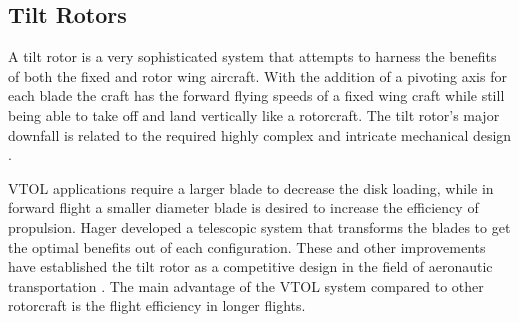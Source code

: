 \documentclass[a4paper, 10pt, conference]{ieeeconf}
\begin{document}
\subsection{Tilt Rotors}

A tilt rotor is a very sophisticated system that attempts to harness the benefits of both the fixed and rotor wing aircraft. With the addition of a pivoting axis for each blade the craft has the forward flying speeds of a fixed wing craft while still being able to take off and land vertically like a rotorcraft. The tilt rotor's major downfall is related to the required highly complex and intricate mechanical design \cite{RotorConfig}.
 
VTOL applications require a larger blade to decrease the disk loading, while in forward flight a smaller diameter blade is desired to increase the efficiency of propulsion. Hager \cite{US6030177} developed a telescopic system that transforms the blades to get the optimal benefits out of each configuration. These and other improvements have established the tilt rotor as a competitive design in the field of aeronautic transportation \cite{RotorConfig}. The main advantage of the VTOL system compared to other rotorcraft is the flight efficiency in longer flights. 

\end{document}
